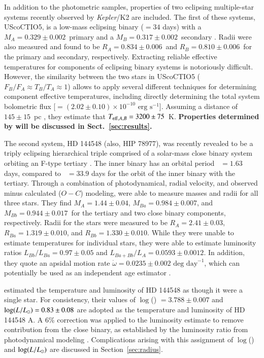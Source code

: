 \documentclass{aa}
\begin{document}
In addition to the photometric samples, properties of two eclipsing multiple-star systems recently observed by \emph{Kepler}/K2 are included. The first of these systems, UScoCTIO5, is a low-mass eclipsing binary (\porb$= 34$ days) with a $M_A = 0.329\pm0.002$\msun\ primary and a $M_B = 0.317\pm0.002$\msun\ secondary \citep{Kraus2015}. Radii were also measured and found to be $R_A = 0.834\pm0.006$\rsun\ and $R_B = 0.810\pm0.006$\rsun\ for the primary and secondary, respectively. Extracting reliable effective temperatures for components of eclipsing binary systems is notoriously difficult. However, the similarity between the two stars in UScoCTIO5 ($F_B/F_A \approx T_B/T_A \approx 1$) allows \citet{Kraus2015} to apply several different techniques for determining component effective temperatures, including directly determining the total system bolometric flux [\fbol$= (2.02\pm0.10)\times10^{-10}\textrm{ erg s}^{-1}$]. Assuming a distance of $145\pm15$~pc \citep{deZeeuw1999}, they estimate that $T_{{\rm eff}, A, B} = 3200\pm75$~K. {\bf Properties determined by \citet{David2015b} will be discussed in Sect.~\ref{sec:results}.}

The second system, HD 144548 (also, HIP 78977), was recently revealed to be a triply eclipsing hierarchical triple comprised of a solar-mass close binary system orbiting an F-type tertiary \citep{Alonso2015}. The inner binary has an orbital period \porb~$= 1.63$ days, compared to \porb~$= 33.9$ days for the orbit of the inner binary with the tertiary. Through a combination of photodynamical, radial velocity, and observed minus calculated ($O-C$) modeling, \citet{Alonso2015} were able to measure masses and radii for all three stars. They find $M_A = 1.44\pm0.04$\msun, $M_{Ba} = 0.984\pm0.007$\msun, and $M_{Bb} = 0.944\pm0.017$\msun\ for the tertiary and two close binary components, respectively. Radii for the stars were measured  to be $R_A = 2.41\pm0.03$\rsun, $R_{Ba} = 1.319\pm0.010$\rsun, and $R_{Bb} = 1.330\pm0.010$\rsun. While they were unable to estimate temperatures for individual stars, they were able to estimate luminosity ratios $L_{Bb}/L_{Ba} = 0.97\pm0.05$ and $L_{Ba + Bb}/L_{A} = 0.0593\pm0.0012$. In addition, they quote an apsidal motion rate $\dot{\omega} = 0.0235 \pm 0.002\textrm{ deg day}^{-1}$, which can potentially be used as an independent age estimator \citep{FD13}.

\citet{Pecaut2012} estimated the temperature and luminosity of HD 144548 as though it were a single star. For consistency, their values of $\log$(\teff) $ = 3.788\pm0.007$ and $\log(L/L_{\odot}) = 0.83\pm0.08$ are adopted as the temperature and luminosity of HD 144548 A. A 6\% correction was applied to the luminosity estimate to remove contribution from the close binary, as established by the luminosity ratio from photodynamical modeling \citep{Alonso2015}. Complications arising with this assignment of $\log$(\teff) and $\log(L/L_{\odot})$ are discussed in Section~\ref{sec:radius}.
\end{document}
